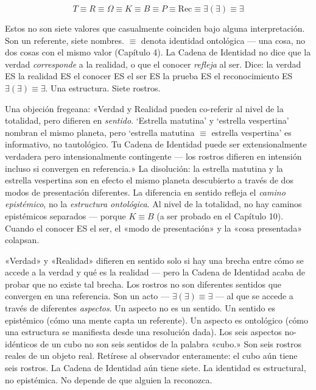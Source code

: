 \documentclass[10pt, openany, oneside]{book}
\begin{document}
\vspace{0.8em}

$$T \equiv R \equiv \Omega \equiv K \equiv B \equiv P \equiv \text{Rec} \equiv \exists(\exists) \equiv \exists$$

Estos no son siete valores que casualmente coinciden bajo alguna interpretación. Son un referente, siete nombres. $\equiv$ denota identidad ontológica --- una cosa, no dos cosas con el mismo valor (Capítulo 4). La Cadena de Identidad no dice que la verdad \textit{corresponde} a la realidad, o que el conocer \textit{refleja} al ser. Dice: la verdad ES la realidad ES el conocer ES el ser ES la prueba ES el reconocimiento ES $\exists(\exists) \equiv \exists$. Una estructura. Siete rostros.

Una objeción fregeana: «Verdad y Realidad pueden co-referir al nivel de la totalidad, pero difieren en \textit{sentido}. `Estrella matutina' y `estrella vespertina' nombran el mismo planeta, pero `estrella matutina $\equiv$ estrella vespertina' es informativo, no tautológico. Tu Cadena de Identidad puede ser extensionalmente verdadera pero intensionalmente contingente --- los rostros difieren en intensión incluso si convergen en referencia.» La disolución: la estrella matutina y la estrella vespertina son en efecto el mismo planeta descubierto a través de dos modos de presentación diferentes. La diferencia en sentido refleja el \textit{camino epistémico}, no la \textit{estructura ontológica}. Al nivel de la totalidad, no hay caminos epistémicos separados --- porque $K \equiv B$ (a ser probado en el Capítulo 10). Cuando el conocer ES el ser, el «modo de presentación» y la «cosa presentada» colapsan.

«Verdad» y «Realidad» difieren en sentido solo si hay una brecha entre cómo se accede a la verdad y qué es la realidad --- pero la Cadena de Identidad acaba de probar que no existe tal brecha. Los rostros no son diferentes sentidos que convergen en una referencia. Son un acto --- $\exists(\exists) \equiv \exists$ --- al que se accede a través de diferentes \textit{aspectos}. Un aspecto no es un sentido. Un sentido es epistémico (cómo una mente capta un referente). Un aspecto es ontológico (cómo una estructura se manifiesta desde una resolución dada). Los seis aspectos no-idénticos de un cubo no son seis sentidos de la palabra «cubo.» Son seis rostros reales de un objeto real. Retírese al observador enteramente: el cubo aún tiene seis rostros. La Cadena de Identidad aún tiene siete. La identidad es estructural, no epistémica. No depende de que alguien la reconozca.
\end{document}
